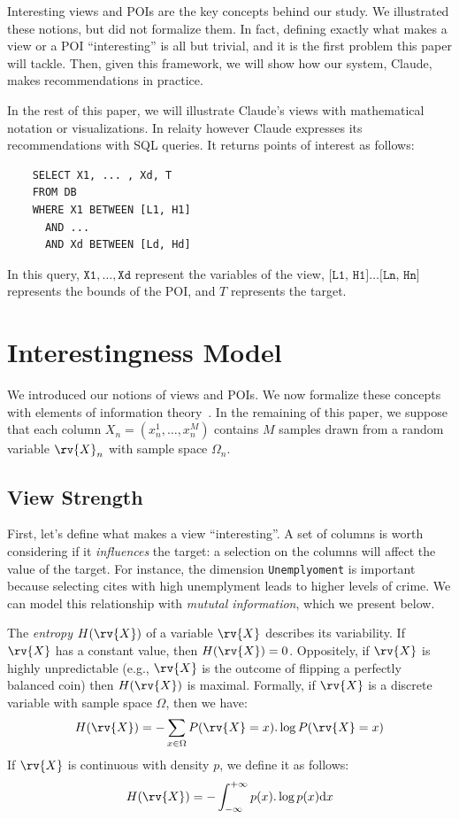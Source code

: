 Interesting views and POIs are the key concepts behind our study. We
illustrated these notions, but did not formalize them. In fact, defining
exactly what makes a view or a POI ``interesting'' is all but trivial, and it
is the first problem this paper will tackle. Then, given this framework, we
will show how our system, Claude, makes recommendations in practice.

In the rest of this paper, we will illustrate Claude's views with mathematical
notation or visualizations. In relaity however Claude expresses its
recommendations with SQL queries. It returns points of interest as follows:
\begin{verbatim}
    SELECT X1, ... , Xd, T
    FROM DB
    WHERE X1 BETWEEN [L1, H1]
      AND ... 
      AND Xd BETWEEN [Ld, Hd]
\end{verbatim}
In this query, $\texttt{X1},\ldots, \texttt{Xd}$ represent the variables of the
view, $\texttt{[L1, H1]}\ldots\texttt{[Ln, Hn]}$ represents the bounds of the
POI, and $T$ represents the target.


\section{Interestingness Model}
\label{sec:formalization}
We introduced our notions of views and POIs. We now formalize
these concepts with elements of information theory~\cite{cover2012elements}. In
the remaining of this paper, we suppose that each column $X_n = (x_n^1, \ldots,
x_n^M)$ contains $M$ samples drawn from a random variable $\rv{X}_n$ with
sample space $\Omega_n$.

\subsection{View Strength}
\label{sec:view-strength}
First, let's define what makes a view ``interesting''. A set of columns is
worth considering if it \emph{influences} the target: a selection on
the columns will affect the value of the target. For instance, the dimension
\texttt{Unemplyoment} is important because selecting cites with high
unemplyment leads to higher levels of crime. We can model this relationship
with \emph{mututal information}, which we present below.

The \emph{entropy} $H(\rv{X})$ of a variable $\rv{X}$ describes its
variability. If $\rv{X}$ has a constant value, then $H(\rv{X}) = 0$.
Oppositely, if $\rv{X}$ is highly unpredictable (e.g., $\rv{X}$ is
the outcome of flipping a perfectly balanced coin) then $H(\rv{X})$ is
maximal. Formally, if $\rv{X}$ is a discrete variable with sample space
$\Omega$, then we have:
\begin{equation}\label{eq:ent-disc}
    H(\rv{X}) = - \sum_{x\in \Omega} P(\rv{X} = x).\log{P(\rv{X} = x)}
\end{equation}
If $\rv{X}$ is continuous with density $p$, we define it as follows:
\begin{equation}\label{eq:ent-cont}
    H(\rv{X}) = - \int_{-\infty}^{+\infty} p(x).\log{p(x)}\mathrm{d}x
\end{equation}

